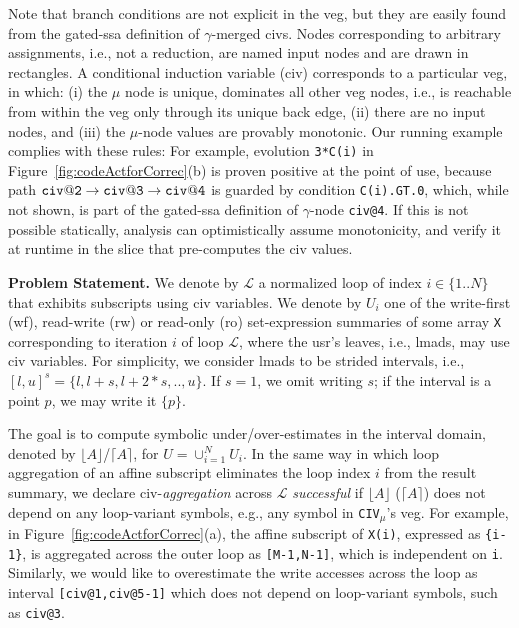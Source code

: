 \documentclass[10pt,nocopyrightspace]{sigplanconf}
\begin{document}
Note that branch conditions are not explicit in the {\sc veg}, 
but they are easily found from the gated-{\sc ssa} definition 
of $\gamma$-merged {\sc civ}s.  
%
Nodes corresponding to arbitrary assignments, i.e., not a reduction, 
are named input nodes and are drawn in rectangles. 
%
A conditional induction variable ({\sc civ}) corresponds to a
particular {\sc veg}, in which:
  (i) the $\mu$ node is unique, dominates all other {\sc veg} nodes,
            i.e., is reachable from within the {\sc veg} only through its
            unique back edge, 
%
 (ii) there are no input nodes, and 
%
(iii) the $\mu$-node values are provably monotonic.
%
Our running example complies with these rules:
For example, evolution {\tt 3*C(i)} in 
Figure~\ref{fig:codeActforCorrec}(b) is proven positive at the 
point of use, because path 
${\tt civ@2}\rightarrow{\tt civ@3}\rightarrow{\tt civ@4}$
is guarded by condition {\tt C(i).GT.0}, which, while not 
shown, is part of the gated-{\sc ssa} definition of $\gamma$-node {\tt civ@4}. 
%
If this is not possible statically, analysis can optimistically
assume monotonicity, and verify it at runtime in the slice 
that pre-computes the {\sc civ} values. 

\vspace{1ex}

{\bf  Problem Statement.}
%
We denote by $\mathcal{L}$ a normalized loop of index $i\in\{1..N\}$ that
exhibits subscripts using {\sc civ} variables.
%
We denote by $U_i$ one of the write-first ({\sc wf}), read-write ({\sc rw})
or read-only ({\sc ro}) set-expression summaries of some array {\tt X} 
corresponding to iteration $i$ of loop $\mathcal{L}$, where the {\sc usr}'s 
leaves, i.e., {\sc lmad}s, may use {\sc civ} variables. 
%
For simplicity, we consider {\sc lmad}s to be 
strided intervals, i.e., $[l,u]^s=\{l, l+s, l+2*s, .., u\}$.
If $s=1$, we omit writing $s$; if the interval 
is a point $p$, we may write it $\{p\}$.

The goal is to compute symbolic under/over-estimates in the 
interval domain, denoted by $\lfloor A \rfloor$/$\lceil A \rceil$, 
for $U = \cup_{i=1}^{N} U_i$.
%
In the same way in which loop aggregation of an affine subscript  
eliminates the loop index $i$ from the result summary,
we declare {\sc civ}-{\em aggregation} across $\mathcal{L}$ {\em successful} 
if $\lfloor A \rfloor$ ($\lceil A \rceil$) does not depend on any loop-variant
symbols, e.g., any symbol in {\tt CIV}$_{\mu}$'s  {\sc veg}. 
%
For example, in Figure~\ref{fig:codeActforCorrec}(a), the affine
subscript of {\tt X(i)}, expressed as {\tt\{i-1\}}, is aggregated across 
the outer loop as {\tt[M-1,N-1]}, which is independent on {\tt i}. 
Similarly, we would like to overestimate the write accesses %
across the loop as interval {\tt[civ@1,civ@5-1]} which does
not depend on loop-variant symbols, such as {\tt civ@3}.
\end{document}
